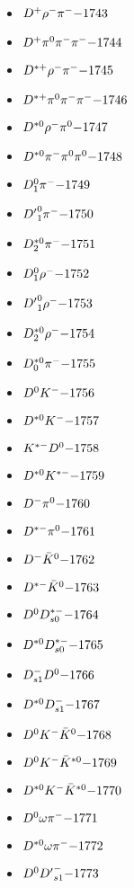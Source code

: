 \begin{multicols}{3}
\begin{itemize}
 \item $ D^{+} \rho^{-} \pi^{-} \hfill{-1743}$
 \item $ D^{+} \pi^{0} \pi^{-} \pi^{-} \hfill{-1744}$
 \item $ D^{*+} \rho^{-} \pi^{-} \hfill{-1745}$
 \item $ D^{*+} \pi^{0} \pi^{-} \pi^{-} \hfill{-1746}$
 \item $ D^{*0} \rho^{-} \pi^{0} \hfill{-1747}$
 \item $ D^{*0} \pi^{-} \pi^{0} \pi^{0} \hfill{-1748}$
 \item $ D_{1}^{0} \pi^{-} \hfill{-1749}$
 \item $ {D^{\prime}}_{1}^{0} \pi^{-} \hfill{-1750}$
 \item $ D_{2}^{*0} \pi^{-} \hfill{-1751}$
 \item $ D_{1}^{0} \rho^{-} \hfill{-1752}$
 \item $ {D^{\prime}}_{1}^{0} \rho^{-} \hfill{-1753}$
 \item $ D_{2}^{*0} \rho^{-} \hfill{-1754}$
 \item $ D_{0}^{*0} \pi^{-} \hfill{-1755}$
 \item $ D^{0} K^{-} \hfill{-1756}$
 \item $ D^{*0} K^{-} \hfill{-1757}$
 \item $ K^{*-} D^{0} \hfill{-1758}$
 \item $ D^{*0} K^{*-} \hfill{-1759}$
 \item $ D^{-} \pi^{0} \hfill{-1760}$
 \item $ D^{*-} \pi^{0} \hfill{-1761}$
 \item $ D^{-} \bar{K}^{0} \hfill{-1762}$
 \item $ D^{*-} \bar{K}^{0} \hfill{-1763}$
 \item $ D^{0} D_{s0}^{*-} \hfill{-1764}$
 \item $ D^{*0} D_{s0}^{*-} \hfill{-1765}$
 \item $ D_{s1}^{-} D^{0} \hfill{-1766}$
 \item $ D^{*0} D_{s1}^{-} \hfill{-1767}$
 \item $ D^{0} K^{-} \bar{K}^{0} \hfill{-1768}$
 \item $ D^{0} K^{-} \bar{K}^{*0} \hfill{-1769}$
 \item $ D^{*0} K^{-} \bar{K}^{*0} \hfill{-1770}$
 \item $ D^{0} \omega \pi^{-} \hfill{-1771}$
 \item $ D^{*0} \omega \pi^{-} \hfill{-1772}$
 \item $ D^{0} {D^{\prime}}_{s1}^{-} \hfill{-1773}$

\end{itemize}
\end{multicols}
